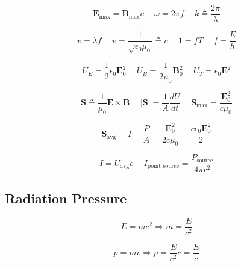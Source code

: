 \documentclass[twocolumn, 12pt]{article}
\begin{document}
\begin{equation*}
    \textbf{E}_{\text{max}}= \textbf{B}_{\text{max}}c \hspace{15pt} \omega =2\pi f \hspace{15pt} k \triangleq \frac{2\pi}{\lambda}
\end{equation*}

\begin{equation*}
    v = \lambda f \hspace{15pt} v = \frac{1}{\sqrt{\epsilon _0 \mu _0}} \triangleq c \hspace{15pt} 1= fT \hspace{15pt} f=\frac{E}{h}
\end{equation*}

\begin{equation*}
    U_E = \frac{1}{2} \epsilon_0 \textbf{E}_0^2  \hspace{15pt} U_B = \frac{1}{2\mu_0} \textbf{B}_0^2 \hspace{15pt} U_T = \epsilon_0 \textbf{E}^2
\end{equation*}

\begin{equation*}
    \textbf{S} \triangleq \frac{1}{\mu _0} \textbf{E} \times \textbf{B} \hspace{15pt} |\textbf{S}| = \frac{1}{A}\frac{dU}{dt} \hspace{15pt} \textbf{S}_{\text{max}} = \frac{\textbf{E}_0^2}{c\mu_0}
\end{equation*}

\begin{equation*}
    \textbf{S}_{\text{avg}}= \textit{I} = \frac{P}{A}= \frac{\textbf{E}_0^2}{2c\mu_0}= \frac{c\epsilon_0 \textbf{E}_0^2}{2}
\end{equation*}

\begin{equation*}
    \textit{I} = U_{\text{avg}} c \hspace{15pt} \textit{I}_{\text{point source}}= \frac{P_{\text{source}}}{4\pi r^2}
\end{equation*}


\subsection*{Radiation Pressure}
\begin{equation*}
    E = mc^2 \Longrightarrow m=\frac{E}{c^2}
\end{equation*}

\begin{equation*}
    p=mv \Longrightarrow p = \frac{E}{c^2}c= \frac{E}{c}
\end{equation*}
\end{document}
